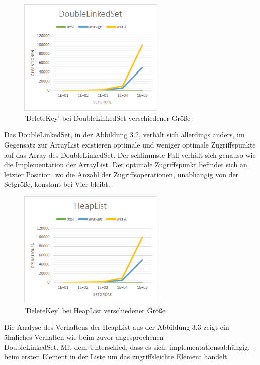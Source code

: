 \documentclass[paper=a4, fontsize=11pt]{scrartcl} %
\numberwithin{equation}{section} %
\numberwithin{figure}{section} %
\numberwithin{table}{section} %
\begin{document}
\begin{figure}[h]
	\begin{center}
		\includegraphics[width=7cm]{grafiken/DeleteKey-DoubleLinkedSet.png}
		\caption{'DeleteKey' bei DoubleLinkedSet verschiedener Größe}
	\end{center}
\end{figure}
Das DoubleLinkedSet, in der Abbildung 3.2, verhält sich allerdings anders, im Gegensatz zur ArrayList existieren optimale und weniger optimale Zugriffspunkte auf das Array des DoubleLinkedSet. Der schlimmste Fall verhält sich genauso wie die Implementation der ArrayList. Der optimale Zugriffspunkt befindet sich an letzter Position, wo die Anzahl der Zugriffsoperationen, unabhängig von der Setgröße, konstant bei Vier bleibt.
\newpage

\begin{figure}[h]
	\begin{center}
		\includegraphics[width=7cm]{grafiken/DeleteKey-HeapList.png}
		\caption{'DeleteKey' bei HeapList verschiedener Größe}
	\end{center}
\end{figure}
Die Analyse des Verhaltens der HeapList aus der Abbildung 3.3 zeigt ein ähnliches Verhalten wie beim zuvor angesprochenen\\
DoubleLinkedSet. Mit dem Unterschied, dass es sich, implementationsabhängig, beim ersten Element in der Liste um das zugriffsleichte Element handelt. 
\end{document}
